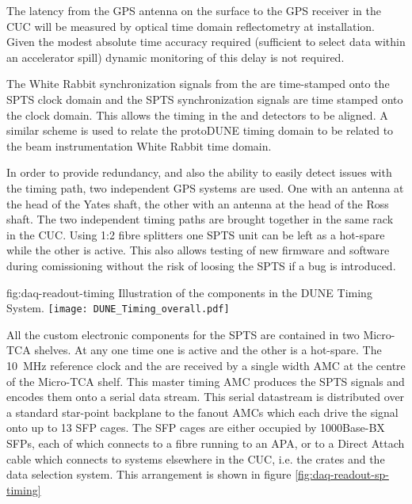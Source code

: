The latency from the GPS antenna on the surface to the GPS receiver in
the CUC will be measured by optical time domain reflectometry at
installation. Given the modest absolute time accuracy required
(sufficient to select data within an accelerator spill) dynamic
monitoring of this delay is not required.

The White Rabbit synchronization signals from the   are
time-stamped onto the SPTS clock domain and the SPTS synchronization
signals are time stamped onto the  clock domain. This allows
the timing in the  and  detectors to be
aligned. A similar scheme is used to relate the  protoDUNE
 timing domain to be related to the beam instrumentation
White Rabbit time domain.

In order to provide redundancy, and also the ability to easily detect
issues with the timing path, two independent GPS systems are used. One
with an antenna at the head of the Yates shaft, the other with an
antenna at the head of the Ross shaft. The two independent timing
paths are brought together in the same rack in the CUC. Using 1:2
fibre splitters one SPTS unit can be left as a hot-spare while the
other is active. This also allows testing of new firmware and software
during comissioning without the risk of loosing the SPTS if a bug is
introduced.


\begin{dunefigure}{fig:daq-readout-timing}
  {Illustration of the components in the DUNE Timing System.}
\texttt{[image: DUNE\_Timing\_overall.pdf]}
\end{dunefigure}

All the custom electronic components for the SPTS are contained in two
Micro-TCA shelves. At any one time one is active and the other is a
hot-spare. The \SI{10}{\MHz} reference clock and the  are received
by a single width AMC at the centre of the Micro-TCA shelf. This
master timing AMC produces the SPTS signals and encodes them onto a
serial data stream. This serial datastream is distributed over a
standard star-point backplane to the fanout AMCs which each drive the
signal onto up to 13 SFP cages. The SFP cages are either occupied by
1000Base-BX SFPs, each of which connects to a fibre running to an APA,
or to a Direct Attach cable which connects to systems elsewhere in the
CUC, i.e. the  crates and the data selection system. This
arrangement is shown in figure \ref{fig:daq-readout-sp-timing}


